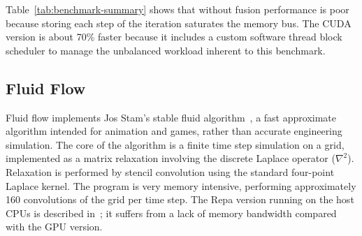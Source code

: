 Table~\ref{tab:benchmark-summary} shows that without fusion performance is poor because storing each step of the iteration saturates the memory bus. The CUDA version is about 70\% faster because it includes a custom software thread block scheduler to manage the unbalanced workload inherent to this benchmark.






\subsection{Fluid Flow}
Fluid flow implements Jos Stam's stable fluid algorithm~\cite{Stam:1999ey}, a fast approximate algorithm intended for animation and games, rather than accurate engineering simulation. The core of the algorithm is a finite time step simulation on a grid, implemented as a matrix relaxation involving the discrete Laplace operator ($\nabla^2$). Relaxation is performed by stencil convolution using the standard four-point Laplace kernel. The program is very memory intensive, performing approximately 160 convolutions of the grid per time step. The Repa version running on the host CPUs is described in~\cite{Lippmeier:Guiding}; it suffers from a lack of memory bandwidth compared with the GPU version. 


